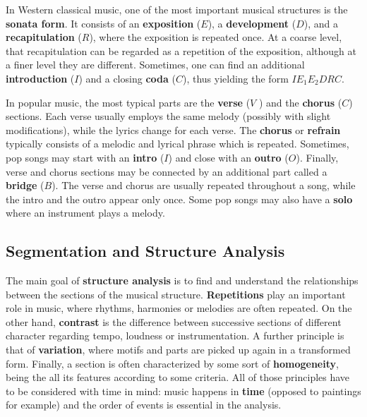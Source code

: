 \documentclass[a4paper, 9pt, twocolumn]{extarticle}
\begin{document}
\medskip

In Western classical music, one of the most important musical structures is the \textbf{sonata form}. It consists of an \textbf{exposition} ($E$), a \textbf{development} ($D$), and a \textbf{recapitulation} ($R$), where the exposition is repeated once. At a coarse level, that recapitulation can be regarded as a repetition of the exposition, although at a finer level they are different. Sometimes, one can find an additional \textbf{introduction} ($I$) and a closing \textbf{coda} ($C$), thus yielding the form $ IE_{1} E_{2} DRC $. 

\medskip

In popular music, the most typical parts are the \textbf{verse} ($V$ ) and the \textbf{chorus} ($C$)
sections. Each verse usually employs the same melody (possibly with slight modifications), while the lyrics change for each verse. The \textbf{chorus} or \textbf{refrain} typically consists of a melodic and lyrical phrase which is repeated. Sometimes, pop songs may start with an \textbf{intro} ($I$) and close with an \textbf{outro} ($O$). Finally, verse and chorus sections may be connected by an additional part called a \textbf{bridge} ($B$). The verse and chorus are usually repeated throughout a song, while the intro and the outro appear only once. Some pop songs may also have a \textbf{solo} where an instrument plays a melody. 


\subsection{Segmentation and Structure Analysis}


The main goal of \textbf{structure analysis} is to find and understand the relationships between the sections of the musical structure. \textbf{Repetitions} play an important role in music, where rhythms, harmonies or melodies are often repeated. On the other hand, \textbf{contrast} is the difference between successive sections of different character regarding tempo, loudness or instrumentation. A further principle is that of \textbf{variation}, where motifs and parts are picked up again in a transformed form. Finally, a section is often characterized by some sort of \textbf{homogeneity}, being the all its features according to some criteria. All of those principles have to be considered with time in mind: music happens in \textbf{time} (opposed to paintings for example) and the order of events is essential in the analysis. 
\end{document}
